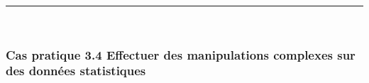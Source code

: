 \documentclass[12pt,twosided, notitlepage]{book}
\begin{document}
\begin{center}\rule{0.5\linewidth}{\linethickness}\end{center}

~

\hypertarget{cas-pratique-3.4-effectuer-des-manipulations-complexes-sur-des-donnees-statistiques}{%
\subsubsection{\texorpdfstring{\textbf{Cas pratique 3.4} Effectuer des
manipulations complexes sur des données
statistiques}{Cas pratique 3.4 Effectuer des manipulations complexes sur des données statistiques}}\label{cas-pratique-3.4-effectuer-des-manipulations-complexes-sur-des-donnees-statistiques}}

\end{document}
